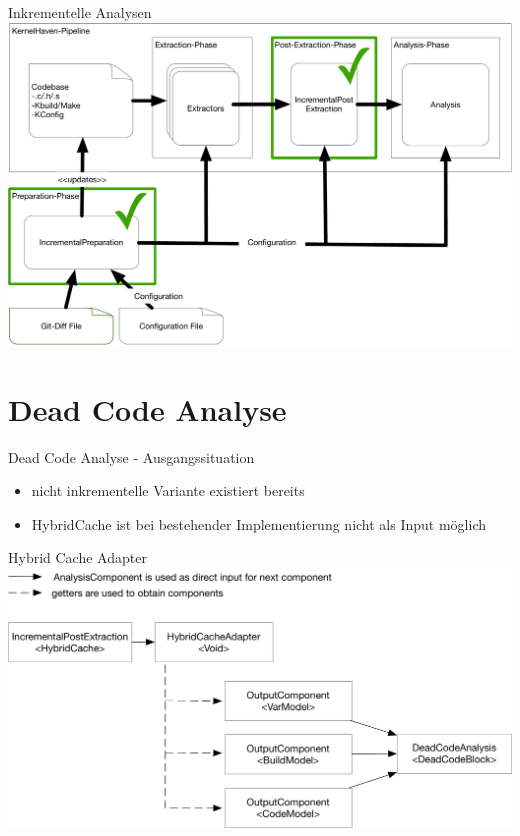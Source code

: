 \documentclass[aspectratio=43, noserifmath]{beamer}
\begin{document}
\begin{frame}[containsverbatim]{Inkrementelle Analysen}
\includegraphics[width=1\textwidth]{image/KernelHavenIncremental-3.pdf}
\end{frame}


\section{Dead Code Analyse}
\begin{frame}{Dead Code Analyse - Ausgangssituation}

\begin{itemize}
    \item[\textbullet] nicht inkrementelle Variante existiert bereits
    \pause
    \item[\textbullet] HybridCache ist bei bestehender Implementierung nicht als Input m\"oglich
\end{itemize}
\end{frame}


\begin{frame}{Hybrid Cache Adapter}
\includegraphics[width=1\textwidth]{image/HybridCacheAdapter.pdf}
\end{frame}
\end{document}
